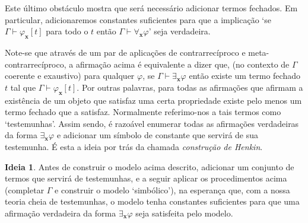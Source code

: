\documentclass{report}
\theoremstyle{definition}
\newtheorem{ideia}{Ideia}
\theoremstyle{remark}
\renewcommand{\bf}[1]{\mathbf{#1}}
\begin{document}
	Este último obstáculo mostra que será necessário adicionar termos fechados. Em particular, adicionaremos constantes suficientes para que a implicação `se $\Gamma \vdash \varphi_{\bf x}[t]$ para todo o $t$ então $\Gamma \vdash \forall_{\bf x} \varphi$' seja verdadeira.
	
	Note-se que através de um par de aplicações de contrarrecíproco e meta-contrarrecíproco, a afirmação acima é equivalente a dizer que, (no contexto de $\Gamma$ coerente e exaustivo) para qualquer $\varphi$, se $\Gamma \vdash \exists_{\bf x} \varphi$ então existe um termo fechado $t$ tal que $\Gamma \vdash \varphi_{\bf x}[t]$.
	Por outras palavras, para todas as afirmações que afirmam a existência de um objeto que satisfaz uma certa propriedade existe pelo menos um termo fechado que a satisfaz. Normalmente referimo-nos a tais termos como `testemunhas'. Assim sendo, é razoável enumerar todas as afirmações verdadeiras da forma $\exists_{\bf x} \varphi$ e adicionar um símbolo de constante que servirá de sua testemunha. É esta a ideia por trás da chamada \emph{construção de Henkin}.
	
	\begin{ideia}
	Antes de construir o modelo acima descrito, adicionar um conjunto de termos que servirá de testemunhas, e a seguir aplicar os procedimentos acima (completar $\Gamma$ e construir o modelo `simbólico'), na esperança que, com a nossa teoria cheia de testemunhas, o modelo tenha constantes suficientes para que uma afirmação verdadeira da forma $\exists_{\bf x} \varphi$ seja satisfeita pelo modelo.
	\end{ideia}
	
\end{document}

